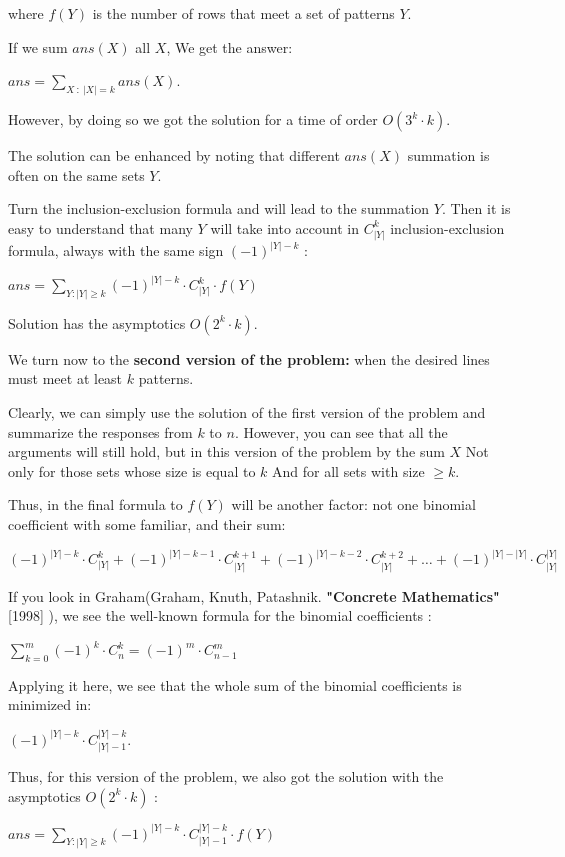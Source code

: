 where $f (Y)$ is the number of rows that meet a set of patterns $Y$.

If we sum $ans (X)$ all $X$, We get the answer:

$ans = \sum_ {X ~: ~ | X | = k} ans (X).$

However, by doing so we got the solution for a time of order $O (3 ^ k \cdot k)$.

The solution can be enhanced by noting that different $ans (X)$ summation is often on the same sets $Y$.

Turn the inclusion-exclusion formula and will lead to the summation $Y$. Then it is easy to understand that many $Y$ will take into account in $C_ {| Y |} ^ k$ inclusion-exclusion formula, always with the same sign $(-1) ^ {| Y |-k}$ :

$ans=\sum_{Y:|Y|\ge k}(-1)^{|Y|-k}\cdot C_{|Y|}^{k}\cdot f(Y)$

Solution has the asymptotics $O (2 ^ k \cdot k)$.

We turn now to the \textbf{second version of the problem:} when the desired lines must meet at least $k$ patterns.

Clearly, we can simply use the solution of the first version of the problem and summarize the responses from $k$ to $n$. However, you can see that all the arguments will still hold, but in this version of the problem by the sum $X$ Not only for those sets whose size is equal to $k$ And for all sets with size $\ge k$.

Thus, in the final formula to $f (Y)$ will be another factor: not one binomial coefficient with some familiar, and their sum:

$(-1)^{|Y|-k}\cdot C_{|Y|}^{k}+(-1)^{|Y|-k-1}\cdot C_{|Y|}^{k+1}+(-1)^{|Y|-k-2}\cdot C_{|Y|}^{k+2}+\ldots+(-1)^{|Y|-|Y|}\cdot C_{|Y|}^{|Y|}$

If you look in Graham(Graham, Knuth, Patashnik. \textbf{"Concrete Mathematics"} [1998] ), we see the well-known formula for the binomial coefficients :

$\sum_{k=0}^{m}(-1)^{k}\cdot C_{n}^{k}=(-1)^{m}\cdot C_{n-1}^{m}$

Applying it here, we see that the whole sum of the binomial coefficients is minimized in:

$(-1) ^ {| Y |-k} \cdot C_ {| Y | -1} ^ {| Y |-k}.$

Thus, for this version of the problem, we also got the solution with the asymptotics $O (2 ^ k \cdot k)$ :

$ans=\sum_{Y:|Y|\ge k}(-1)^{|Y|-k}\cdot C_{|Y|-1}^{|Y|-k}\cdot f(Y)$

